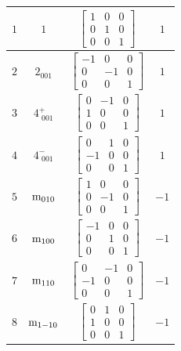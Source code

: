 \documentclass[fleqn,8pt]{jsarticle}
\begin{document}
\begin{longtable}{cccc}
$ 1 $ & $ 1 $ & $ \begin{bmatrix} 1 & 0 & 0 \\ 0 & 1 & 0 \\ 0 & 0 & 1 \end{bmatrix} $ & $ 1 $ \\ \hline
$ 2 $ & $ 2{}_{001} $ & $ \begin{bmatrix} -1 & 0 & 0 \\ 0 & -1 & 0 \\ 0 & 0 & 1 \end{bmatrix} $ & $ 1 $ \\ \hline
$ 3 $ & $ 4^{+}_{\,\,001} $ & $ \begin{bmatrix} 0 & -1 & 0 \\ 1 & 0 & 0 \\ 0 & 0 & 1 \end{bmatrix} $ & $ 1 $ \\ \hline
$ 4 $ & $ 4^{-}_{\,\,001} $ & $ \begin{bmatrix} 0 & 1 & 0 \\ -1 & 0 & 0 \\ 0 & 0 & 1 \end{bmatrix} $ & $ 1 $ \\ \hline
$ 5 $ & $ {\rm m}_{010} $ & $ \begin{bmatrix} 1 & 0 & 0 \\ 0 & -1 & 0 \\ 0 & 0 & 1 \end{bmatrix} $ & $ -1 $ \\ \hline
$ 6 $ & $ {\rm m}_{100} $ & $ \begin{bmatrix} -1 & 0 & 0 \\ 0 & 1 & 0 \\ 0 & 0 & 1 \end{bmatrix} $ & $ -1 $ \\ \hline
$ 7 $ & $ {\rm m}_{110} $ & $ \begin{bmatrix} 0 & -1 & 0 \\ -1 & 0 & 0 \\ 0 & 0 & 1 \end{bmatrix} $ & $ -1 $ \\ \hline
$ 8 $ & $ {\rm m}_{1-10} $ & $ \begin{bmatrix} 0 & 1 & 0 \\ 1 & 0 & 0 \\ 0 & 0 & 1 \end{bmatrix} $ & $ -1 $ \\
\end{longtable}
\end{document}
